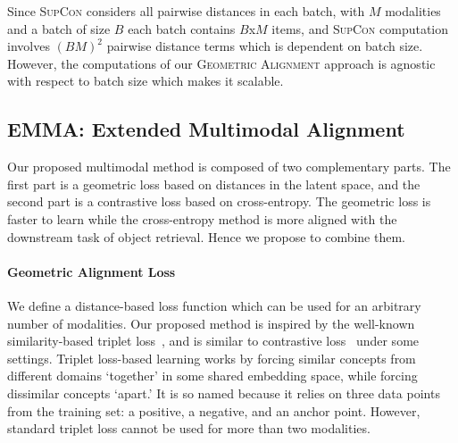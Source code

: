 \documentclass[10pt]{article} %
\newcommand{\geom}{\textsc{Geometric Alignment}}
\newcommand{\supcon}{\textsc{SupCon}}
\begin{document}
Since \supcon{} considers all pairwise distances in each batch, with $M$ modalities and a batch of size $B$ each batch contains $B$x$M$ items, and \supcon{} computation involves $(BM)^2$ pairwise distance terms which is dependent on batch size. However, the computations of our \geom{} approach is agnostic with respect to batch size which makes it scalable.

\subsection{EMMA: Extended Multimodal Alignment}
\label{sec:emma}

Our proposed multimodal method is composed of two complementary parts. The first part is a geometric loss based on distances in the latent space, and the second part is a contrastive loss based on cross-entropy. The geometric loss is faster to learn while the cross-entropy method is more aligned with the downstream task of object retrieval. Hence we propose to combine them. 

\paragraph{Geometric Alignment Loss}
\label{subsec:geom-loss}

We define a distance-based loss function which can be used for an arbitrary number of modalities. Our proposed method is inspired by the well-known similarity-based triplet loss~\citep{Carvalho-cooking-triplet,triplet_loss_2021_CVPR}, and is similar to contrastive loss~\citep{chen2020simple,NEURIPS2020_supervised_contrastive} under some settings.
Triplet loss-based learning works by forcing similar concepts from different domains `together' in some shared embedding space, while forcing dissimilar concepts `apart.' It is so named because it relies on three data points from the training set: a positive, a negative, and an anchor point. 
However, standard triplet loss cannot be used for more than two modalities.
\end{document}
